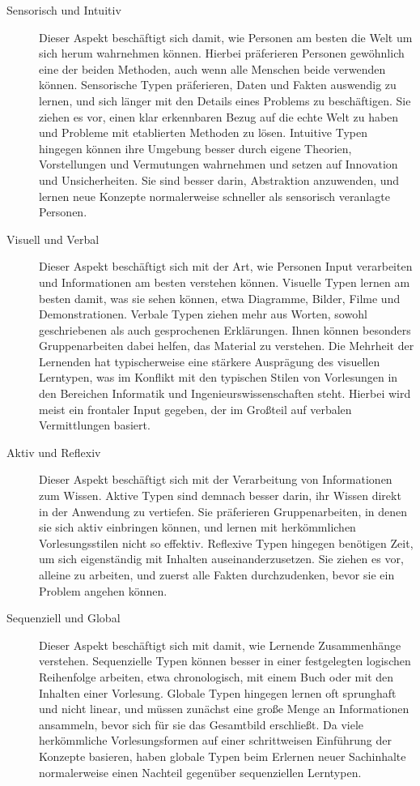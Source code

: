 \begin{description}
    \item[Sensorisch und Intuitiv] Dieser Aspekt beschäftigt sich damit, wie Personen am besten die Welt um sich herum wahrnehmen können. Hierbei präferieren Personen gewöhnlich eine der beiden Methoden, auch wenn alle Menschen beide verwenden können. Sensorische Typen präferieren, Daten und Fakten auswendig zu lernen, und sich länger mit den Details eines Problems zu beschäftigen. Sie ziehen es vor, einen klar erkennbaren Bezug auf die echte Welt zu haben und Probleme mit etablierten Methoden zu lösen. Intuitive Typen hingegen können ihre Umgebung besser durch eigene Theorien, Vorstellungen und Vermutungen wahrnehmen und setzen auf Innovation und Unsicherheiten. Sie sind besser darin, Abstraktion anzuwenden, und lernen neue Konzepte normalerweise schneller als sensorisch veranlagte Personen.
    \item[Visuell und Verbal] Dieser Aspekt beschäftigt sich mit der Art, wie Personen Input verarbeiten und Informationen am besten verstehen können. Visuelle Typen lernen am besten damit, was sie sehen können, etwa Diagramme, Bilder, Filme und Demonstrationen. Verbale Typen ziehen mehr aus Worten, sowohl geschriebenen als auch gesprochenen Erklärungen. Ihnen können besonders Gruppenarbeiten dabei helfen, das Material zu verstehen. Die Mehrheit der Lernenden hat typischerweise eine stärkere Ausprägung des visuellen Lerntypen, was im Konflikt mit den typischen Stilen von Vorlesungen in den Bereichen Informatik und Ingenieurswissenschaften steht. Hierbei wird meist ein frontaler Input gegeben, der im Großteil auf verbalen Vermittlungen basiert.
    \item[Aktiv und Reflexiv]  Dieser Aspekt beschäftigt sich mit der Verarbeitung von Informationen zum Wissen. Aktive Typen sind demnach besser darin, ihr Wissen direkt in der Anwendung zu vertiefen. Sie präferieren Gruppenarbeiten, in denen sie sich aktiv einbringen können, und lernen mit herkömmlichen Vorlesungsstilen nicht so effektiv. Reflexive Typen hingegen benötigen Zeit, um sich eigenständig mit Inhalten auseinanderzusetzen. Sie ziehen es vor, alleine zu arbeiten, und zuerst alle Fakten durchzudenken, bevor sie ein Problem angehen können.
    \item[Sequenziell und Global] Dieser Aspekt beschäftigt sich mit damit, wie Lernende Zusammenhänge verstehen. Sequenzielle Typen können besser in einer festgelegten logischen Reihenfolge arbeiten, etwa chronologisch, mit einem Buch oder mit den Inhalten einer Vorlesung. Globale Typen hingegen lernen oft sprunghaft und nicht linear, und müssen zunächst eine große Menge an Informationen ansammeln, bevor sich für sie das Gesamtbild erschließt. Da viele herkömmliche Vorlesungsformen auf einer schrittweisen Einführung der Konzepte basieren, haben globale Typen beim Erlernen neuer Sachinhalte normalerweise einen Nachteil gegenüber sequenziellen Lerntypen.
\end{description}


